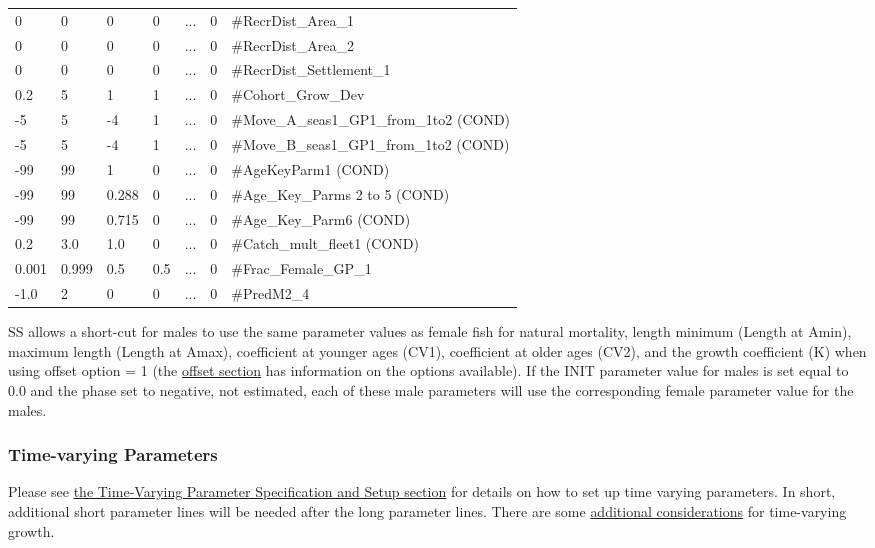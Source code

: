 \begin{longtable}{p{1.1cm} p{1.1cm} p{1.1cm}  p{1.1cm}  p{1.5cm}  p{1.1cm}  p{6.75cm}  }
	 0   & 0    & 0    & 0    & \multicolumn{1}{c}{...} & 0 & \#RecrDist\_Area\_1 \\
	 0   & 0    & 0    & 0    & \multicolumn{1}{c}{...} & 0 & \#RecrDist\_Area\_2 \\
	 0   & 0    & 0    & 0    & \multicolumn{1}{c}{...} & 0 & \#RecrDist\_Settlement\_1 \\
	 0.2 & 5    & 1    & 1    & \multicolumn{1}{c}{...} & 0 & \#Cohort\_Grow\_Dev \\
	-5   & 5    & -4   & 1    & \multicolumn{1}{c}{...} & 0 & \#Move\_A\_seas1\_GP1\_from\_1to2 (COND)\\
    -5   & 5    & -4   & 1    & \multicolumn{1}{c}{...} & 0 & \#Move\_B\_seas1\_GP1\_from\_1to2 (COND)\\
	-99  & 99   &  1   & 0    & \multicolumn{1}{c}{...} & 0 & \#AgeKeyParm1 (COND)\\
	-99  & 99   &  0.288   & 0    & ... & 0 & \#Age\_Key\_Parms 2 to 5 (COND)\\
	-99  & 99   &  0.715   & 0    & ... & 0 & \#Age\_Key\_Parm6 (COND)\\	
	0.2  & 3.0   &  1.0   & 0    & ... & 0 & \#Catch\_mult\_fleet1 (COND)\\
	0.001 & 0.999 & 0.5 & 0.5    & ... & 0 & \#Frac\_Female\_GP\_1 \\
	-1.0 & 2 & 0 & 0    & ... & 0 & \#PredM2\_4 \Bstrut\\		
	\hline
\end{longtable}

\hypertarget{male-shortcut}{}
SS allows a short-cut for males to use the same parameter values as female fish for natural mortality, length minimum (Length at Amin), maximum length (Length at Amax), coefficient at younger ages (CV1), coefficient at older ages (CV2), and the growth coefficient (K) when using offset option = 1 (the \hyperlink{offset}{offset section} has information on the options available).  If the INIT parameter value for males is set equal to 0.0 and the phase set to negative, not estimated, each of these male parameters will use the  corresponding female parameter value for the males.

\subsubsection{Time-varying Parameters}
Please see \hyperlink{tvOrder}{the Time-Varying Parameter Specification and Setup section} for details on how to set up time varying parameters. In short, additional short parameter lines will be needed after the long parameter lines. There are some \hyperlink{tvgrowth}{additional considerations} for time-varying growth.

